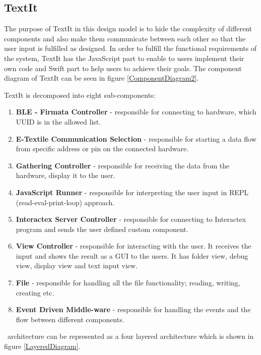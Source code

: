 \subsection{TextIt}
The purpose of TextIt in this design model is to hide the complexity of different components and also make them communicate between each other so that the user input is fulfilled as designed. In order to fulfill the functional requirements of the system, TextIt has the JavaScript part to enable to users implement their own code and Swift part to help users to achieve their goals. The component diagram of TextIt can be seen in figure \ref{ComponentDiagram2}.



 TextIt is decomposed into eight sub-components:
\begin{enumerate}
\item \textbf{BLE - Firmata Controller} - responsible for connecting to hardware, which UUID is in the allowed list.
\item \textbf{E-Textile Communication Selection} - responsible for starting a data flow from specific address or pin on the connected hardware.
\item \textbf{Gathering Controller} - responsible for receiving the data from the hardware, display it to the user.
\item \textbf{JavaScript Runner} - responsible for interpreting the user input in REPL (read-eval-print-loop) approach. 
\item \textbf{Interactex Server Controller} - responsible for connecting to Interactex program and sends the user defined custom component.
\item \textbf{View Controller} - responsible for interacting with the user. It receives the input and shows the result as a GUI to the users. It has folder view, debug view, display view and text input view.
\item \textbf{File} - responsible for handling all the file functionality; reading, writing, creating etc.
\item \textbf{Event Driven Middle-ware} - responsible for handling the events and the flow between different components.

\end{enumerate}

\seif\ architecture can be represented as a four layered architecture which is shown in figure \ref{LayeredDiagram}. 

